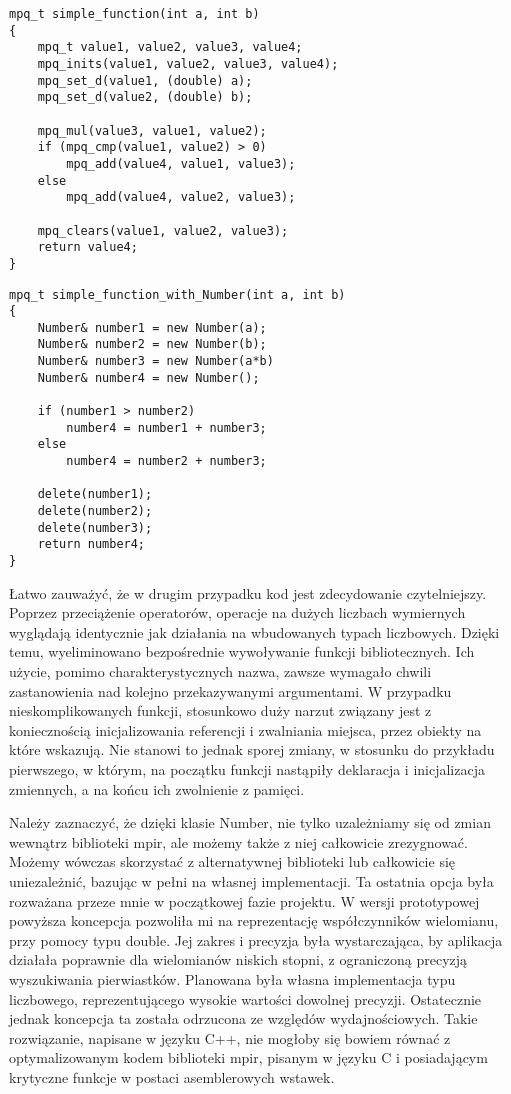 \documentclass[twoside,a4paper]{book}
\begin{document}
\begin{lstlisting}
mpq_t simple_function(int a, int b)
{
	mpq_t value1, value2, value3, value4;
	mpq_inits(value1, value2, value3, value4);
	mpq_set_d(value1, (double) a);
	mpq_set_d(value2, (double) b);

	mpq_mul(value3, value1, value2);
	if (mpq_cmp(value1, value2) > 0)
		mpq_add(value4, value1, value3);
	else
		mpq_add(value4, value2, value3);

	mpq_clears(value1, value2, value3);
	return value4;
}
\end{lstlisting}

\begin{lstlisting}
mpq_t simple_function_with_Number(int a, int b)
{
	Number& number1 = new Number(a);
	Number& number2 = new Number(b);
	Number& number3 = new Number(a*b)
	Number& number4 = new Number();

	if (number1 > number2)
		number4 = number1 + number3;
	else
		number4 = number2 + number3;

	delete(number1);
	delete(number2);
	delete(number3);
	return number4;
}
\end{lstlisting}

Łatwo zauważyć, że w drugim przypadku kod jest zdecydowanie czytelniejszy. Poprzez przeciążenie operatorów, operacje na dużych liczbach wymiernych wyglądają identycznie jak działania na wbudowanych typach liczbowych. Dzięki temu, wyeliminowano bezpośrednie wywoływanie funkcji bibliotecznych. Ich użycie, pomimo charakterystycznych nazwa, zawsze wymagało chwili zastanowienia nad kolejno przekazywanymi argumentami. W przypadku nieskomplikowanych funkcji, stosunkowo duży narzut związany jest z koniecznością inicjalizowania referencji i zwalniania miejsca, przez obiekty na które wskazują. Nie stanowi to jednak sporej zmiany, w stosunku do przykładu pierwszego, w którym, na początku funkcji nastąpiły deklaracja i inicjalizacja zmiennych, a na końcu ich zwolnienie z pamięci.

Należy zaznaczyć, że dzięki klasie Number, nie tylko uzależniamy się od zmian wewnątrz biblioteki mpir, ale możemy także z niej całkowicie zrezygnować. Możemy wówczas skorzystać z alternatywnej biblioteki lub całkowicie się uniezależnić, bazując w pełni na własnej implementacji. Ta ostatnia opcja była rozważana przeze mnie w początkowej fazie projektu. W wersji prototypowej powyższa koncepcja pozwoliła mi na reprezentację współczynników wielomianu, przy pomocy typu double. Jej zakres i precyzja była wystarczająca, by aplikacja działała poprawnie dla wielomianów niskich stopni, z ograniczoną precyzją wyszukiwania pierwiastków. Planowana była własna implementacja typu liczbowego, reprezentującego wysokie wartości dowolnej precyzji. Ostatecznie jednak koncepcja ta została odrzucona ze względów wydajnościowych. Takie rozwiązanie, napisane w języku C++, nie mogłoby się bowiem równać z optymalizowanym kodem biblioteki mpir, pisanym w języku C i posiadającym krytyczne funkcje w postaci asemblerowych wstawek.
\end{document}
